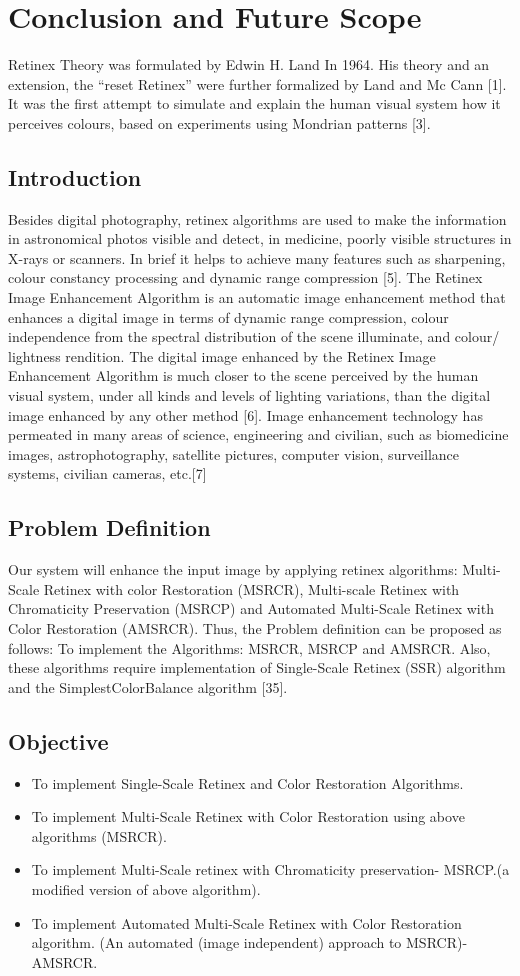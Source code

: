 \chapter{Conclusion and Future Scope}
Retinex Theory was formulated by Edwin H. Land In 1964. His theory and an extension, the “reset Retinex” were further formalized by Land and Mc Cann [1]. It was the first attempt to simulate and explain the human visual system how it perceives colours, based on experiments using Mondrian patterns [3].
\section{Introduction}
Besides digital photography, retinex algorithms are used to make the information in astronomical photos visible and detect, in medicine, poorly visible structures in X-rays or scanners. In brief it helps to achieve many features such as sharpening, colour constancy processing and dynamic range compression [5]. The Retinex Image Enhancement Algorithm is an automatic image enhancement method that enhances a digital image in terms of dynamic range compression, colour independence from the spectral distribution of the scene illuminate, and colour/ lightness rendition. The digital image enhanced by the Retinex Image Enhancement Algorithm is much closer to the scene perceived by the human visual system, under all kinds and levels of lighting variations, than the digital image enhanced by any other method [6]. Image enhancement technology has permeated in many areas of science, engineering and civilian, such as biomedicine images, astrophotography, satellite pictures, computer vision, surveillance systems, civilian cameras, etc.[7]

\section{Problem Definition}
Our system will enhance the input image by applying retinex algorithms: Multi-Scale Retinex with color Restoration (MSRCR), Multi-scale Retinex with Chromaticity Preservation (MSRCP) and Automated Multi-Scale Retinex with Color Restoration (AMSRCR). Thus, the Problem definition can be proposed as follows: To implement the Algorithms: MSRCR, MSRCP and AMSRCR. Also, these algorithms require implementation of Single-Scale Retinex (SSR) algorithm and the SimplestColorBalance algorithm [35].
\section{Objective}
	\begin{itemize}
		\item To implement Single-Scale Retinex and Color Restoration Algorithms.
		\item To implement Multi-Scale Retinex with Color Restoration using above 
		algorithms (MSRCR).
		\item To implement Multi-Scale retinex with Chromaticity preservation- MSRCP.(a 
		modified version of above algorithm).
		\item To implement Automated Multi-Scale Retinex with Color Restoration algorithm.	
		(An automated (image independent) approach to MSRCR)- AMSRCR.
	\end{itemize}
	

